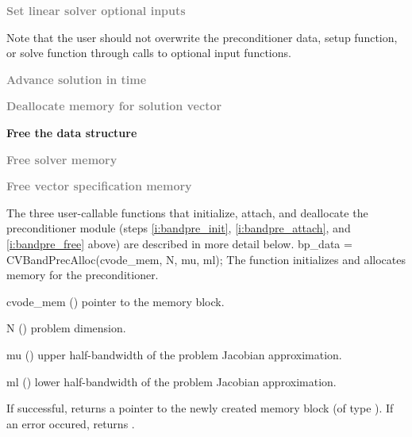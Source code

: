 \begin{Steps}
\item
  \textcolor{gray}{\bf Set linear solver optional inputs}

  Note that the user should not overwrite the preconditioner data, setup function, 
  or solve function through calls to {\cvspgmr} optional input functions.

\item
  \textcolor{gray}{\bf Advance solution in time}

\item
  \textcolor{gray}{\bf Deallocate memory for solution vector}

\item \label{i:bandpre_free}
  {\bf Free the {\cvbandpre} data structure}


\item
  \textcolor{gray}{\bf Free solver memory}
  
\item
  \textcolor{gray}{\bf Free vector specification memory}

\end{Steps}
The three user-callable functions that initialize, attach, and deallocate
the {\cvbandpre} preconditioner module (steps \ref{i:bandpre_init},
\ref{i:bandpre_attach}, and \ref{i:bandpre_free} above) are described
in more detail below.
{
  bp\_data = CVBandPrecAlloc(cvode\_mem, N, mu, ml);
}
{
  The function  initializes and allocates
  memory for the {\cvbandpre} preconditioner.
}
{
  \begin{args}
  \item[cvode\_mem] ()
    pointer to the {\cvodes} memory block.
  \item[N] ()
    problem dimension.
  \item[mu] ()
    upper half-bandwidth of the problem Jacobian approximation.
  \item[ml] ()
    lower half-bandwidth of the problem Jacobian approximation.
  \end{args}
}
{
  If successful,  returns a pointer to the newly created 
  {\cvbandpre} memory block (of type ).
  If an error occured,  returns .
}

